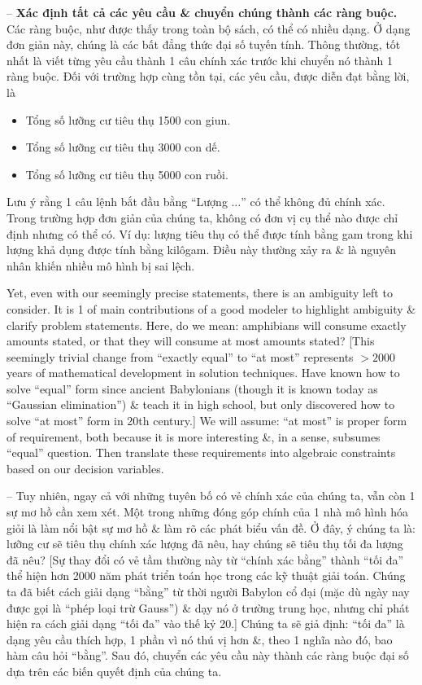 \documentclass{article}
\begin{document}
\begin{itemize}
\begin{itemize}
\begin{enumerate}
            -- {\bf Xác định tất cả các yêu cầu \& chuyển chúng thành các ràng buộc.} Các ràng buộc, như được thấy trong toàn bộ sách, có thể có nhiều dạng. Ở dạng đơn giản này, chúng là các bất đẳng thức đại số tuyến tính. Thông thường, tốt nhất là viết từng yêu cầu thành 1 câu chính xác trước khi chuyển nó thành 1 ràng buộc. Đối với trường hợp cùng tồn tại, các yêu cầu, được diễn đạt bằng lời, là
            \begin{itemize}
                \item Tổng số lưỡng cư tiêu thụ 1500 con giun.
                \item Tổng số lưỡng cư tiêu thụ 3000 con dế.
                \item Tổng số lưỡng cư tiêu thụ 5000 con ruồi.
            \end{itemize}
            Lưu ý rằng 1 câu lệnh bắt đầu bằng ``Lượng $\ldots$'' có thể không đủ chính xác. Trong trường hợp đơn giản của chúng ta, không có đơn vị cụ thể nào được chỉ định nhưng có thể có. Ví dụ: lượng tiêu thụ có thể được tính bằng gam trong khi lượng khả dụng được tính bằng kilôgam. Điều này thường xảy ra \& là nguyên nhân khiến nhiều mô hình bị sai lệch.

            Yet, even with our seemingly precise statements, there is an ambiguity left to consider. It is 1 of main contributions of a good modeler to highlight ambiguity \& clarify problem statements. Here, do we mean: amphibians will consume exactly amounts stated, or that they will consume at most amounts stated? [This seemingly trivial change from ``exactly equal'' to ``at most'' represents $> 2000$ years of mathematical development in solution techniques. Have known how to solve ``equal'' form since ancient Babylonians (though it is known today as ``Gaussian elimination'') \& teach it in high school, but only discovered how to solve ``at most'' form in 20th century.] We will assume: ``at most'' is proper form of requirement, both because it is more interesting \&, in a sense, subsumes ``equal'' question. Then translate these requirements into algebraic constraints based on our decision variables.

            -- Tuy nhiên, ngay cả với những tuyên bố có vẻ chính xác của chúng ta, vẫn còn 1 sự mơ hồ cần xem xét. Một trong những đóng góp chính của 1 nhà mô hình hóa giỏi là làm nổi bật sự mơ hồ \& làm rõ các phát biểu vấn đề. Ở đây, ý chúng ta là: lưỡng cư sẽ tiêu thụ chính xác lượng đã nêu, hay chúng sẽ tiêu thụ tối đa lượng đã nêu? [Sự thay đổi có vẻ tầm thường này từ ``chính xác bằng'' thành ``tối đa'' thể hiện hơn 2000 năm phát triển toán học trong các kỹ thuật giải toán. Chúng ta đã biết cách giải dạng ``bằng'' từ thời người Babylon cổ đại (mặc dù ngày nay được gọi là ``phép loại trừ Gauss'') \& dạy nó ở trường trung học, nhưng chỉ phát hiện ra cách giải dạng ``tối đa'' vào thế kỷ 20.] Chúng ta sẽ giả định: ``tối đa'' là dạng yêu cầu thích hợp, 1 phần vì nó thú vị hơn \&, theo 1 nghĩa nào đó, bao hàm câu hỏi ``bằng''. Sau đó, chuyển các yêu cầu này thành các ràng buộc đại số dựa trên các biến quyết định của chúng ta.


\end{enumerate}
\end{itemize}
\end{itemize}
\end{document}
